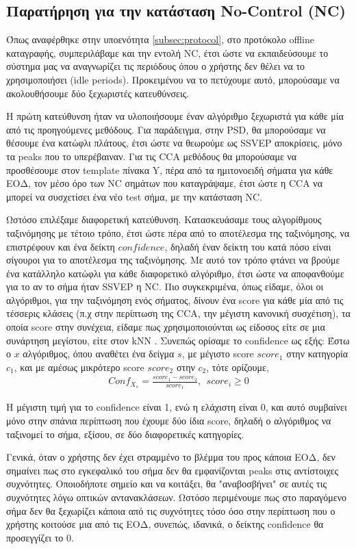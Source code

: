 \documentclass[11pt,a4paper,english,greek,twoside]{../Thesis}
\begin{document}
\subsection{Παρατήρηση για την κατάσταση No-Control (NC)}
\par Όπως αναφέρθηκε στην υποενότητα \ref{subsec:protocol}, στο προτόκολο offline καταγραφής, συμπεριλάβαμε και την εντολή NC, έτσι ώστε να εκπαιδεύσουμε το σύστημα μας να αναγνωρίζει τις περιόδους όπου ο χρήστης δεν θέλει να το χρησιμοποιήσει (idle periods). Προκειμένου να το πετύχουμε αυτό, μπορούσαμε να ακολουθήσουμε δύο ξεχωριστές κατευθύνσεις. 
\par Η πρώτη κατεύθυνση ήταν να υλοποιήσουμε έναν αλγόριθμο ξεχωριστά για κάθε μία από τις προηγούμενες μεθόδους. Για παράδειγμα, στην PSD, θα μπορούσαμε να θέσουμε ένα κατώφλι πλάτους, έτσι ώστε να θεωρούμε ως SSVEP αποκρίσεις, μόνο τα peaks που το υπερέβαιναν. Για τις CCA μεθόδους θα μπορούσαμε να προσθέσουμε στον template πίνακα Y, πέρα από τα ημιτονοειδή σήματα για κάθε ΕΟΔ, τον μέσο όρο των NC σημάτων που καταγράψαμε, έτσι ώστε η CCA να μπορεί να συσχετίσει ένα νέο test σήμα, με την κατάσταση NC. 
\par Ωστόσο επιλέξαμε διαφορετική κατεύθυνση. Κατασκευάσαμε τους αλγορίθμους ταξινόμησης με τέτοιο τρόπο, έτσι ώστε πέρα από το αποτέλεσμα της ταξινόμησης, να επιστρέφουν και ένα δείκτη $confidence$, δηλαδή έναν δείκτη του κατά πόσο είναι σίγουροι για το αποτέλεσμα της ταξινόμησης. Με αυτό τον τρόπο φτάνει να βρούμε ένα κατάλληλο κατώφλι για κάθε διαφορετικό αλγόριθμο, έτσι ώστε να αποφανθούμε για το αν το σήμα ήταν SSVEP η NC. Πιο συγκεκριμένα, όπως είδαμε, όλοι οι αλγόριθμοι, για την ταξινόμηση ενός σήματος, δίνουν ένα score για κάθε μία από τις τέσσερις κλάσεις (π.χ στην περίπτωση της CCA, την μέγιστη κανονική συσχέτιση), τα οποία score στην συνέχεια, είδαμε πως χρησιμοποιούνται ως είδοσος είτε σε μια συνάρτηση μεγίστου, είτε στον kNN . Συνεπώς ορίσαμε το confidence ως εξής: Έστω ο $x$ αλγόριθμος, όπου αναθέτει ένα δείγμα $s$, με μέγιστο score $score_1$ στην κατηγορία $c_1$, και με αμέσως μικρότερο score $score_2$ στην $c_2$, τότε ορίζουμε,
\begin{align}
    Conf_{X_s} = \frac{score_1 - score_2}{score_1}, \ \ score_i\geqslant 0
\end{align}

Η μέγιστη τιμή για το confidence είναι 1, ενώ η ελάχιστη είναι 0, και αυτό συμβαίνει μόνο στην σπάνια περίπτωση που έχουμε δύο ίδια score, δηλαδή ο αλγόριθμος να ταξινομεί το σήμα, εξίσου, σε δύο διαφορετικές κατηγορίες. 
\par Γενικά, όταν ο χρήστης δεν έχει στραμμένο το βλέμμα του προς κάποια ΕΟΔ, δεν σημαίνει πως στο εγκεφαλικό του σήμα δεν θα εμφανίζονται peaks στις αντίστοιχες συχνότητες. Οποιοδήποτε σημείο και να κοιτάξει, θα "αναβοσβήνει" σε αυτές τις συχνότητες λόγω οπτικών αντανακλάσεων. Ωστόσο περιμένουμε πως στο παραγόμενο σήμα δεν θα ξεχωρίζει κάποια από τις συχνότητες τόσο όσο στην περίπτωση που ο χρήστης κοιτούσε μια από τις ΕΟΔ, συνεπώς, ιδανικά, ο δείκτης confidence θα προσεγγίζει το 0.
\end{document}
